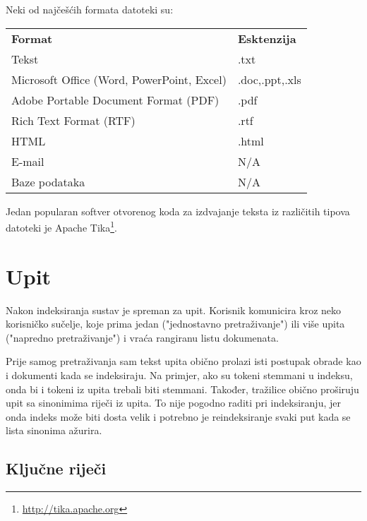 \documentclass[11pt]{scrreprt}
\begin{document}
Neki od najčešćih formata datoteki su:

\begin{center}
  \begin{tabular}{ll}
    \textbf{Format}                            & \textbf{Esktenzija} \\
    Tekst                                      & .txt                \\
    Microsoft Office (Word, PowerPoint, Excel) & .doc,.ppt,.xls      \\
    Adobe Portable Document Format (PDF)       & .pdf                \\
    Rich Text Format (RTF)                     & .rtf                \\
    HTML                                       & .html               \\
    E-mail                                     & N/A                 \\
    Baze podataka                              & N/A                 \\
  \end{tabular}
\end{center}

Jedan popularan softver otvorenog koda za izdvajanje teksta iz različitih tipova datoteki je Apache Tika\footnote{\url{http://tika.apache.org}}.

\section{Upit}

Nakon indeksiranja sustav je spreman za upit. Korisnik komunicira kroz neko korisničko sučelje, koje prima jedan ("jednostavno pretraživanje") ili više upita ("napredno pretraživanje") i vraća rangiranu listu dokumenata.

Prije samog pretraživanja sam tekst upita obično prolazi isti postupak obrade kao i dokumenti kada se indeksiraju. Na primjer, ako su tokeni stemmani u indeksu, onda bi i tokeni iz upita trebali biti stemmani. Također, tražilice obično proširuju upit sa sinonimima riječi iz upita. To nije pogodno raditi pri indeksiranju, jer onda indeks može biti dosta velik i potrebno je reindeksiranje svaki put kada se lista sinonima ažurira.

\subsection{Ključne riječi}
\end{document}
